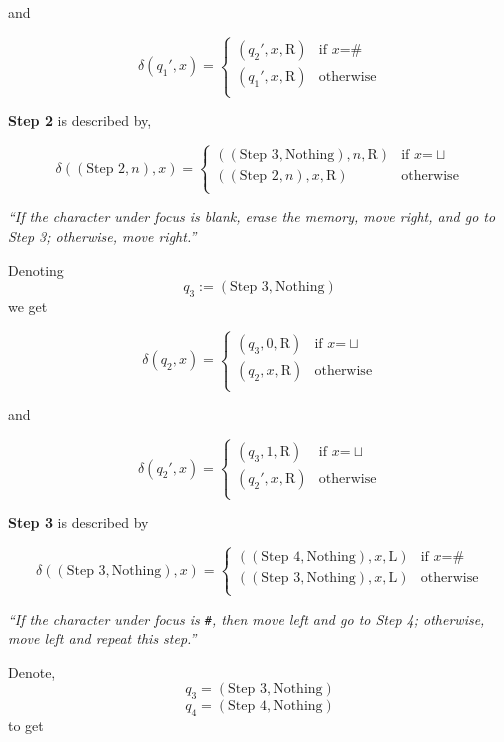 and

\[\delta(q_1', x) = \begin{cases}
(q_2' ,x, \mathrm{R}) & \text{if } x \text{=} \#\\
(q_1',x, \mathrm{R}) & \text{otherwise}\\
\end{cases}
\]

\textbf{Step 2} is described by,

\[\delta((\text{Step 2},n), x) = \begin{cases}
((\text{Step 3},\text{Nothing}),n, \mathrm{R}) & \text{if } x \text{=} \sqcup\\
((\text{Step 2},n),x, \mathrm{R}) & \text{otherwise}\\
\end{cases}
\]

\emph{``If the character under focus is blank, erase the memory, move
right, and go to Step 3; otherwise, move right.''}

Denoting \[q_3:=(\text{Step 3},\text{Nothing})\] we get

\[\delta(q_2, x) = \begin{cases}
(q_3,0, \mathrm{R}) & \text{if } x \text{=} \sqcup\\
(q_2,x, \mathrm{R}) & \text{otherwise}\\
\end{cases}
\]

and

\[\delta(q_2', x) = \begin{cases}
(q_3,1, \mathrm{R}) & \text{if } x \text{=} \sqcup \\
(q_2',x, \mathrm{R}) & \text{otherwise}\\
\end{cases}
\]

\textbf{Step 3} is described by

\[\delta((\text{Step 3},\text{Nothing}), x) = \begin{cases}
((\text{Step 4},\text{Nothing}),x, \mathrm{L}) & \text{if } x \text{=} \#\\
((\text{Step 3},\text{Nothing}),x, \mathrm{L}) & \text{otherwise}\\
\end{cases}
\]

\emph{``If the character under focus is \texttt{\#}, then move left and
go to Step 4; otherwise, move left and repeat this step.''}

Denote, \[q_3=(\text{Step 3},\text{Nothing})\]
\[q_4=(\text{Step 4},\text{Nothing})\] to get

